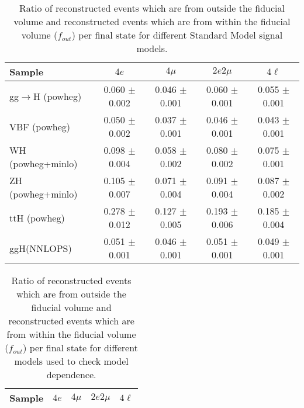 \begin{table}[!h!tb]
\begin{center}
\small
\caption{
Ratio of reconstructed events which are from outside the fiducial volume and reconstructed events which are from within the fiducial volume ($f_{out}$) per final state for different Standard Model signal models.
\label{tab:foutSM}
}
\begin{tabular}{|l|c|c|c|c|} \hline 
Sample & $4e$ & $4\mu$ & $2e2\mu$ & $4\ell$ \\ \hline 
gg$\rightarrow$H ({\sc powheg})  & 0.060 $\pm$ 0.002 & 0.046 $\pm$ 0.001 & 0.060 $\pm$ 0.001 & 0.055 $\pm$ 0.001 \\ 
VBF ({\sc powheg})  & 0.050 $\pm$ 0.002 & 0.037 $\pm$ 0.001 & 0.046 $\pm$ 0.001 & 0.043 $\pm$ 0.001 \\ 
WH ({\sc powheg+minlo}) & 0.098 $\pm$ 0.004 & 0.058 $\pm$ 0.002 & 0.080 $\pm$ 0.002 & 0.075 $\pm$ 0.001 \\ 
ZH ({\sc powheg+minlo})  & 0.105 $\pm$ 0.007 & 0.071 $\pm$ 0.004 & 0.091 $\pm$ 0.004 & 0.087 $\pm$ 0.002 \\ 
ttH ({\sc powheg}) & 0.278 $\pm$ 0.012 & 0.127 $\pm$ 0.005 & 0.193 $\pm$ 0.006 & 0.185 $\pm$ 0.004 \\ 
ggH(NNLOPS) & 0.051 $\pm$ 0.001 & 0.046 $\pm$ 0.001 & 0.051 $\pm$ 0.001 & 0.049 $\pm$ 0.001 \\ 

\hline
\end{tabular}
\normalsize
\end{center}
\end{table}
 
 
 
\begin{table}[!h!tb]
\begin{center}
\small
\caption{
Ratio of reconstructed events which are from outside the fiducial volume and reconstructed events which are from within the fiducial volume ($f_{out}$) per final state for different models used to check model dependence.
\label{tab:foutExo}
}
\begin{tabular}{|l|c|c|c|c|} \hline 
Sample & $4e$ & $4\mu$ & $2e2\mu$ & $4\ell$ \\ \hline 

\hline
\end{tabular}
\normalsize
\end{center}
\end{table}
 
 
 
